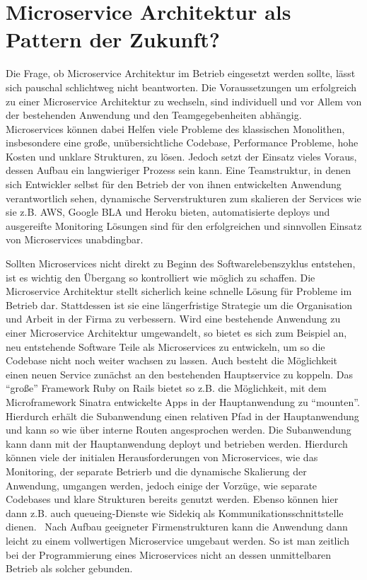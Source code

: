 \chapter{Microservice Architektur als Pattern der Zukunft?}

Die Frage, ob Microservice Architektur im Betrieb eingesetzt werden sollte, lässt sich pauschal schlichtweg nicht beantworten. Die Voraussetzungen um erfolgreich zu einer Microservice Architektur zu wechseln, sind individuell und vor Allem von der bestehenden Anwendung und den Teamgegebenheiten abhängig. Microservices können dabei Helfen viele Probleme des klassischen Monolithen, insbesondere eine große, unübersichtliche Codebase, Performance Probleme, hohe Kosten und unklare Strukturen, zu lösen. Jedoch setzt der Einsatz vieles Voraus, dessen Aufbau ein langwieriger Prozess sein kann. Eine Teamstruktur, in denen sich Entwickler selbst für den Betrieb der von ihnen entwickelten Anwendung verantwortlich sehen, dynamische Serverstrukturen  zum skalieren der Services wie sie z.B. AWS, Google BLA und Heroku bieten, automatisierte deploys und ausgereifte Monitoring Lösungen sind für den erfolgreichen und sinnvollen Einsatz von Microservices unabdingbar.

Sollten Microservices nicht direkt zu Beginn des Softwarelebenszyklus entstehen, ist es wichtig den Übergang so kontrolliert wie möglich zu schaffen. Die Microservice Architektur stellt sicherlich keine schnelle Lösung für Probleme im Betrieb dar. Stattdessen ist sie eine längerfristige Strategie um die Organisation und Arbeit in der Firma zu verbessern. Wird eine bestehende Anwendung zu einer Microservice Architektur umgewandelt, so bietet es sich zum Beispiel an, neu entstehende Software Teile als Microservices zu entwickeln, um so die Codebase nicht noch weiter wachsen zu lassen. Auch besteht die Möglichkeit einen neuen Service zunächst an den bestehenden Hauptservice zu koppeln. Das ``große'' Framework Ruby on Rails bietet so z.B. die Möglichkeit, mit dem Microframework Sinatra entwickelte Apps in der Hauptanwendung zu ``mounten''. Hierdurch erhält die Subanwendung einen relativen Pfad in der Hauptanwendung und kann so wie über interne Routen angesprochen werden. Die Subanwendung kann dann mit der Hauptanwendung deployt und betrieben werden. Hierdurch können viele der initialen Herausforderungen von Microservices, wie das Monitoring, der separate Betrierb und die dynamische Skalierung der Anwendung, umgangen werden, jedoch einige der Vorzüge, wie separate Codebases und klare Strukturen bereits genutzt werden. Ebenso können hier dann z.B. auch queueing-Dienste wie Sidekiq als Kommunikationsschnittstelle dienen.~\cite[vgl.][]{sidekiqmessaging} Nach Aufbau geeigneter Firmenstrukturen kann die Anwendung dann leicht zu einem vollwertigen Microservice umgebaut werden. So ist man zeitlich bei der Programmierung eines Microservices nicht an dessen unmittelbaren Betrieb als solcher gebunden.

